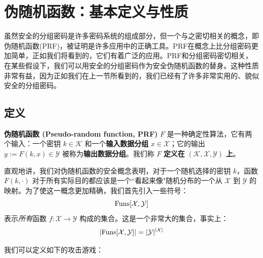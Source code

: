 \section{伪随机函数：基本定义与性质}

虽然安全的分组密码是许多密码系统的组成部分，但一个与之密切相关的概念，即伪随机函数(PRF)，被证明是许多应用中的正确工具。PRF在概念上比分组密码更加简单，正如我们将看到的，它们有着广泛的应用。PRF和分组密码密切相关，在某些假设下，我们可以用安全的分组密码作为安全伪随机函数的替身。这种性质非常有益，因为正如我们在上一节所看到的，我们已经有了许多非常实用的、貌似安全的分组密码。

\subsection{定义}

\textbf{伪随机函数 (Pseudo-random function, PRF)} $F$ 是一种确定性算法，它有两个输入：一个密钥 $k\in\mathcal{K}$ 和一个\textbf{输入数据分组} $x\in\mathcal{X}$；它的输出 $y:=F(k,x)\in\mathcal{Y}$ 被称为\textbf{输出数据分组}。我们称 $F$ \textbf{定义在} $(\mathcal{K},\mathcal{X},\mathcal{Y})$ \textbf{上}。

直观地讲，我们对伪随机函数的安全概念表明，对于一个随机选择的密钥 $k$，函数 $F(k,\cdot)$ 对于所有实际目的都应该是一个``看起来像"随机分布的一个从 $\mathcal{X}$ 到 $\mathcal{Y}$ 的映射。为了使这一概念更加精确，我们首先引入一些符号：
\[
{\rm Funs}[\mathcal{X},\mathcal{Y}]
\]
表示\emph{所有}函数 $f:\mathcal{X}\to\mathcal{Y}$ 构成的集合。这是一个非常大的集合，事实上：
\[
|{\rm Funs}[\mathcal{X},\mathcal{Y}]|=|\mathcal{Y}|^{|\mathcal{X}|}
\]

我们可以定义如下的攻击游戏：

